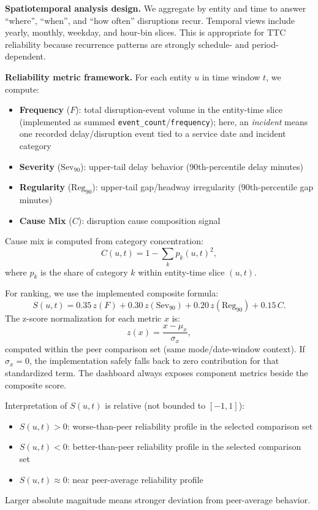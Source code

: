 \textbf{Spatiotemporal analysis design.}
We aggregate by entity and time to answer ``where'', ``when'', and ``how often'' disruptions recur. Temporal views include yearly, monthly, weekday, and hour-bin slices. This is appropriate for TTC reliability because recurrence patterns are strongly schedule- and period-dependent.

\textbf{Reliability metric framework.}
For each entity $u$ in time window $t$, we compute:
\begin{itemize}
    \item \textbf{Frequency} ($F$): total disruption-event volume in the entity-time slice (implemented as summed \texttt{event\_count}/\texttt{frequency}); here, an \emph{incident} means one recorded delay/disruption event tied to a service date and incident category
    \item \textbf{Severity} ($\mathrm{Sev}_{90}$): upper-tail delay behavior (90th-percentile delay minutes)
    \item \textbf{Regularity} ($\mathrm{Reg}_{90}$): upper-tail gap/headway irregularity (90th-percentile gap minutes)
    \item \textbf{Cause Mix} ($C$): disruption cause composition signal
\end{itemize}

Cause mix is computed from category concentration:
\[
C(u,t)=1-\sum_{k} p_k(u,t)^2,
\]
where $p_k$ is the share of category $k$ within entity-time slice $(u,t)$.

For ranking, we use the implemented composite formula:
\[
S(u,t)=0.35\,z(F)+0.30\,z(\mathrm{Sev}_{90})+0.20\,z(\mathrm{Reg}_{90})+0.15\,C.
\]
The z-score normalization for each metric $x$ is:
\[
z(x)=\frac{x-\mu_x}{\sigma_x},
\]
computed within the peer comparison set (same mode/date-window context). If $\sigma_x=0$, the implementation safely falls back to zero contribution for that standardized term. The dashboard always exposes component metrics beside the composite score.

Interpretation of $S(u,t)$ is relative (not bounded to $[-1,1]$):
\begin{itemize}
    \item $S(u,t)>0$: worse-than-peer reliability profile in the selected comparison set
    \item $S(u,t)<0$: better-than-peer reliability profile in the selected comparison set
    \item $S(u,t)\approx 0$: near peer-average reliability profile
\end{itemize}
Larger absolute magnitude means stronger deviation from peer-average behavior.

